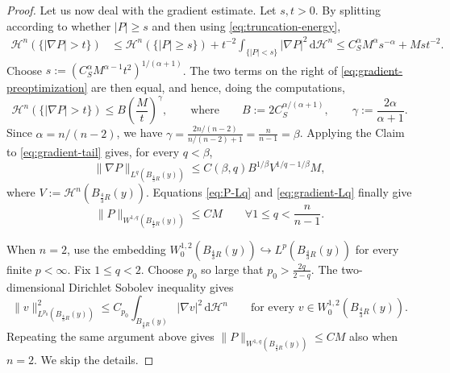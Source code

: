 \documentclass[12pt,a4paper,reqno]{amsart}
\renewcommand{\leq}{\leqslant}
\renewcommand{\geq}{\geqslant}
\begin{document}
\begin{proof}
Let us now deal with the gradient estimate. Let $s,t>0$.  By splitting according to whether
$|P|\geq s$ and then using
\eqref{eq:truncation-energy},
\begin{align}
 \mathcal{H}^n(\{|\nabla P|>t\})
 &\leq \mathcal{H}^n(\{|P|\geq s\})
   +t^{-2}\int_{\{|P|<s\}}|\nabla P|^2\,\mathrm{d}\mathcal{H}^n \leq C_S^{\alpha} M^\alpha s^{-\alpha}
       +Ms t^{-2}.
\label{eq:gradient-preoptimization}
\end{align}
Choose $
 s:=\left(C_S^{\alpha} M^{\alpha-1}t^2\right)^{1/(\alpha+1)}$.
The two terms on the right of
\eqref{eq:gradient-preoptimization} are then equal, and hence, doing the computations,
\begin{equation}\label{eq:gradient-tail}
 \mathcal{H}^n(\{|\nabla P|>t\})
 \leq B\left(\frac{M}{t}\right)^\gamma,
 \qquad \text{where} \qquad 
 B:=2C_S^{\alpha/(\alpha+1)},\qquad
 \gamma:=\frac{2\alpha}{\alpha+1}.
\end{equation}
Since $\alpha=n/(n-2)$, we have $
 \gamma=\frac{2n/(n-2)}{n/(n-2)+1}
       =\frac{n}{n-1}
       =\beta$.
Applying
the Claim to \eqref{eq:gradient-tail} gives,
for every $q<\beta$,
\begin{equation}\label{eq:gradient-Lq}
 \|\nabla P\|_{L^q(B_{\frac{4}{3}R}(y))}
 \leq C(\beta,q)B^{1/\beta}
       V^{1/q-1/\beta}M,
\end{equation}
where $V:=\mathcal{H}^n(B_{\frac{4}{3}R}(y))$.
Equations \eqref{eq:P-Lq} and \eqref{eq:gradient-Lq} finally give
\begin{equation}\label{eq:P-W1q-n-large}
 \|P\|_{W^{1,q}(B_{\frac{4}{3}R}(y))}\leq C M
 \qquad \forall {1\leq q<\frac{n}{n-1}}.
\end{equation}

When $n=2$, use the  embedding
$W^{1,2}_0(B_{\frac{4}{3}R}(y))\hookrightarrow L^p(B_{\frac{4}{3}R}(y))$ for every finite $p<\infty$.
Fix $1\leq q<2$.  Choose $p_0$ so large that $
 p_0>\frac{2q}{2-q}$.
The two-dimensional Dirichlet Sobolev inequality gives
\[
 \|v\|_{L^{p_0}(B_{\frac{4}{3}R}(y))}^2
 \leq C_{p_0}\int_{B_{\frac{4}{3}R}(y)}|\nabla v|^2\,\mathrm{d}\mathcal{H}^n
 \qquad\text{for every }v\in W^{1,2}_0(B_{\frac{4}{3}R}(y)).
\]
Repeating the same argument above gives $\|P\|_{W^{1,q}(B_{\frac{4}{3}R}(y))}\leq CM$ also when $n=2$. We skip the details.


\end{proof}
\end{document}

